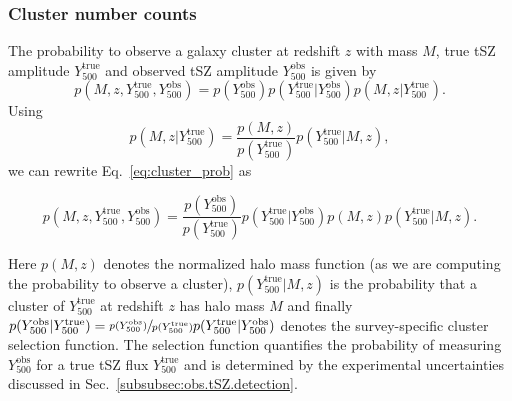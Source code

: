 \documentclass[%
 reprint,
nofootinbib,
 amsmath,amssymb,
 aps,
]{revtex4-1}
\begin{document}
\subsubsection{Cluster number counts}

The probability to observe a galaxy cluster at redshift $z$ with mass $M$, true tSZ amplitude $Y_{500}^{\mathrm{true}}$ and observed tSZ amplitude $Y_{500}^{\mathrm{obs}}$ is given by
\begin{equation}
p(M, z, Y_{500}^{\mathrm{true}}, Y_{500}^{\mathrm{obs}}) = p(Y_{500}^{\mathrm{obs}}) p(Y_{500}^{\mathrm{true}}|Y_{500}^{\mathrm{obs}}) p(M, z|Y_{500}^{\mathrm{true}}).
\label{eq:cluster_prob}
\end{equation}
Using 
\begin{equation}
p(M, z|Y_{500}^{\mathrm{true}}) = \frac{p(M, z)}{p(Y_{500}^{\mathrm{true}})}  p(Y_{500}^{\mathrm{true}}|M, z),
\end{equation}
we can rewrite Eq.~\ref{eq:cluster_prob} as
\begin{widetext}
\begin{equation}
p(M, z, Y_{500}^{\mathrm{true}}, Y_{500}^{\mathrm{obs}}) = \frac{p(Y_{500}^{\mathrm{obs}})}{p(Y_{500}^{\mathrm{true}})} p(Y_{500}^{\mathrm{true}}|Y_{500}^{\mathrm{obs}}) p(M, z) p(Y_{500}^{\mathrm{true}}|M, z).
\label{eq:cluster-prob}
\end{equation}
\end{widetext}
Here $p(M, z)$ denotes the normalized halo mass function (as we are computing the probability to observe a cluster), $p(Y_{500}^{\mathrm{true}}|M, z)$ is the probability that a cluster of $Y_{500}^{\mathrm{true}}$ at redshift $z$ has halo mass $M$ and finally $p(Y_{500}^{\mathrm{obs}}|Y_{500}^{\mathrm{true}}) = \sfrac{p(Y_{500}^{\mathrm{obs}})}{p(Y_{500}^{\mathrm{true}})} p(Y_{500}^{\mathrm{true}}|Y_{500}^{\mathrm{obs}})$ denotes the survey-specific cluster selection function. The selection function quantifies the probability of measuring $Y_{500}^{\mathrm{obs}}$ for a true tSZ flux $Y_{500}^{\mathrm{true}}$ and is determined by the experimental uncertainties discussed in Sec.~\ref{subsubsec:obs.tSZ.detection}.
\end{document}
